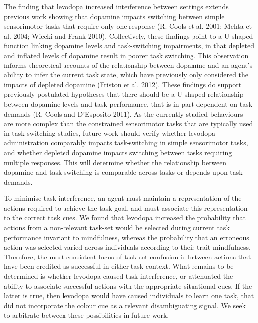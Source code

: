 \documentclass{article}
\begin{document}
The finding that levodopa increased interference between settings
extends previous work showing that dopamine impacts switching between
simple sensorimotor tasks that require only one response (R. Cools et
al. 2001; Mehta et al. 2004; Wiecki and Frank 2010). Collectively, these
findings point to a U-shaped function linking dopamine levels and
task-switching impairments, in that depleted and inflated levels of
dopamine result in poorer task switching. This observation informs
theoretical accounts of the relationship between dopamine and an agent's
ability to infer the current task state, which have previously only
considered the impacts of depleted dopamine (Friston et al. 2012). These
findings do support previously postulated hypotheses that there should
be a U shaped relationship between dopamine levels and task-performance,
that is in part dependent on task demands (R. Cools and D'Esposito
2011). As the currently studied behaviours are more complex than the
constrained sensorimotor tasks that are typically used in task-switching
studies, future work should verify whether levodopa administration
comparably impacts task-switching in simple sensorimotor tasks, and
whether depleted dopamine impacts switching between tasks requiring
multiple responses. This will determine whether the relationship between
dopamine and task-switching is comparable across tasks or depends upon
task demands.

To minimise task interference, an agent must maintain a representation
of the actions required to achieve the task goal, and must associate
this representation to the correct task cues. We found that levodopa
increased the probability that actions from a non-relevant task-set
would be selected during current task performance invariant to
mindfulness, whereas the probability that an erroneous action was
selected varied across individuals according to their trait mindfulness.
Therefore, the most consistent locus of task-set confusion is between
actions that have been credited as successful in either task-context.
What remains to be determined is whether levodopa caused
task-interference, or attenuated the ability to associate successful
actions with the appropriate situational cues. If the latter is true,
then levodopa would have caused individuals to learn one task, that did
not incorporate the colour cue as a relevant disambiguating signal. We
seek to arbitrate between these possibilities in future work.
\end{document}
